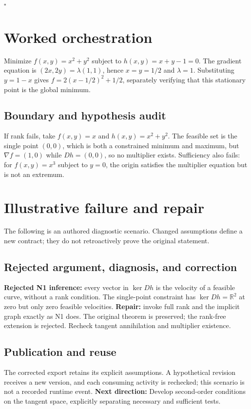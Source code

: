 \documentclass[preprint,12pt,aps,pra,showkeys,amsmath,amssymb,superscriptaddress,floatfix]{revtex4-2}
\theoremstyle{definition}
\theoremstyle{remark}
\begin{document}
\hfill$\square$

\section{Worked orchestration}

Minimize \(f(x,y)=x^2+y^2\) subject to \(h(x,y)=x+y-1=0\). The gradient
equation is \((2x,2y)=\lambda(1,1)\), hence \(x=y=1/2\) and
\(\lambda=1\). Substituting \(y=1-x\) gives \(f=2(x-1/2)^2+1/2\),
separately verifying that this stationary point is the global minimum.

\subsection{Boundary and hypothesis audit}

If rank fails, take \(f(x,y)=x\) and \(h(x,y)=x^2+y^2\). The feasible
set is the single point \((0,0)\), which is both a constrained minimum
and maximum, but \(\nabla f=(1,0)\) while \(Dh=(0,0)\), so no multiplier
exists. Sufficiency also fails: for \(f(x,y)=x^3\) subject to \(y=0\),
the origin satisfies the multiplier equation but is not an extremum.

\section{Illustrative failure and repair}

The following is an authored diagnostic scenario. Changed assumptions
define a new contract; they do not retroactively prove the original
statement.

\subsection{Rejected argument, diagnosis, and correction}
\textbf{Rejected N1 inference:} every vector in \(\ker Dh\) is the
velocity of a feasible curve, without a rank condition. The single-point
constraint has \(\ker Dh=\mathbb R^2\) at zero but only zero feasible
velocities. \textbf{Repair:} invoke full rank and the implicit graph
exactly as N1 does. The original theorem is preserved; the rank-free
extension is rejected. Recheck tangent annihilation and multiplier
existence.

\subsection{Publication and reuse}
The corrected export retains its explicit assumptions. A hypothetical
revision receives a new version, and each consuming activity is
rechecked; this scenario is not a recorded runtime event. \textbf{Next
direction:} Develop second-order conditions on the tangent space,
explicitly separating necessary and sufficient tests.
\end{document}
